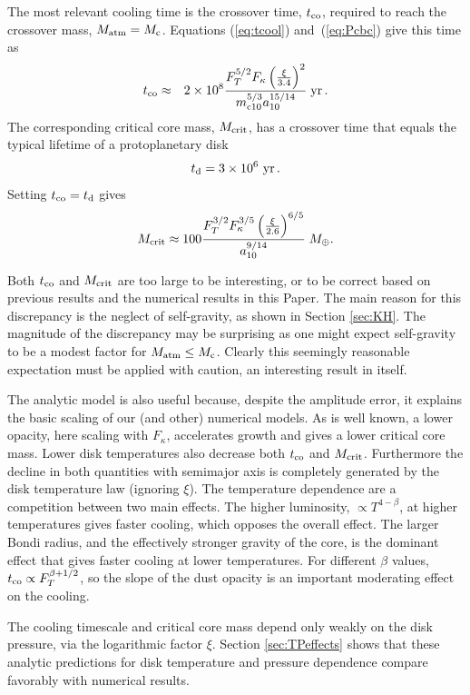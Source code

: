 \documentclass[apj, numberedappendix]{emulateapj}
\newcommand{\yr}{\; {\rm yr}}
\newcommand{\Eqs}[2]{Equations (\ref{#1}) and~(\ref{#2})}
\newcommand{\co}{_{\rm c}}
\newcommand{\di}{_{\rm d}}
\newcommand{\mcn}[1] { m_{ \rm c #1} }
\newcommand{\MC}{M_{\rm crit}}
\newcommand{\aun}[1]{ a_{#1} }
\begin{document}
The most relevant cooling time is the crossover time, $t_{\rm co}$, required to reach the crossover mass, $M_{\rm{atm}} = M_{\rm c}$. \Eqs{eq:tcool}{eq:Pcbc} give this time as
\begin{eqnarray} 
\label{eq:tcoolan}
t_{\rm co} &\approx & 2 \times 10^8 {F_T^{5/2}  F_\kappa \left(\xi \over 3.4\right)^2  \over \mcn{10}^{5/3} \aun{10}^{15 / 14}} \yr \, .
\end{eqnarray} 
The corresponding critical core mass, $\MC$, has a crossover time that equals the typical lifetime of a protoplanetary disk
\begin{equation}
t\di = 3 \times 10^6 ~{\rm yr} \,.
\end{equation} 
Setting $t_{\rm co} = t\di$ gives
\begin{equation}\label{eq:Mcrit}
\MC \approx 100 {F_T^{3/2} F_\kappa^{3/5}   \left(\xi \over 2.6 \right)^{6/5} \over \aun{10}^{9 / 14}} \; M_\oplus.
\end{equation} 

Both $t_{\rm co}$ and $\MC$ are too large to be interesting, or to be correct based on previous results and the numerical results in this Paper.  The main reason for this discrepancy is the neglect of self-gravity, as shown in Section \ref{sec:KH}.  The magnitude of the discrepancy may be surprising as one might expect self-gravity to be a modest factor for $M_{\rm atm} \leq M\co$.  Clearly this seemingly reasonable expectation must be applied with caution, an interesting result in itself.

The analytic model is also useful because, despite the amplitude error, it explains the basic scaling of our (and other) numerical models.  As is well known, a lower opacity, here scaling with $F_\kappa$, accelerates growth and gives a lower critical core mass. Lower disk temperatures also decrease both $t_{\rm co}$ and $\MC$.  Furthermore the decline in both quantities with semimajor axis is completely generated by the disk temperature law (ignoring $\xi$).  The temperature dependence are a competition between two main effects.  The higher luminosity, $\propto T^{4-\beta}$, at higher temperatures gives faster cooling, which opposes the overall effect.  The larger Bondi radius, and the effectively stronger gravity of the core, is the dominant effect that gives faster cooling at lower temperatures.  For different $\beta$ values, $t_{\rm co} \propto F_T^{ \beta + 1/2}$, so the slope of the dust opacity is an important moderating effect on the cooling.

The cooling timescale and critical core mass depend only weakly on the disk pressure, via the  logarithmic factor $\xi$.  Section \ref{sec:TPeffects} shows that these analytic predictions for disk temperature and pressure dependence compare favorably with numerical results.  %
\end{document}
